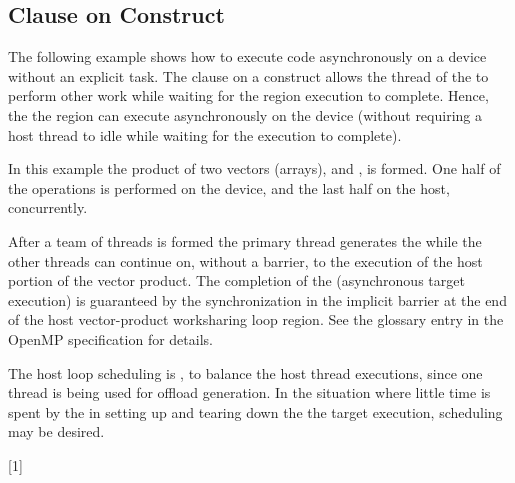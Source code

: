 \subsection{ Clause on  Construct}
\label{subsec:target_nowait_clause}

The following example shows how to execute code asynchronously on a 
device without an explicit task. The  clause on a  
construct allows the thread of the  to perform other
work while waiting for the  region execution to complete. 
Hence, the the  region can execute asynchronously on the 
device (without requiring a host thread to idle while waiting for 
the  execution to complete).

In this example the product of two vectors (arrays), 
and , is formed. One half of the operations is performed
on the device, and the last half on the host, concurrently.

After a team of threads is formed the primary thread generates 
the  while the other threads can continue on, without a barrier,
to the execution of the host portion of the vector product.
The completion of the  (asynchronous target execution) is 
guaranteed by the synchronization in the implicit barrier at the end of the 
host vector-product worksharing loop region. See the  
glossary entry in the OpenMP specification for details.

The host loop scheduling is , to balance the host thread executions, since 
one thread is being used for offload generation. In the situation where 
little time is spent by the  in setting 
up and tearing down the the target execution,  scheduling may be desired. 


[1]

